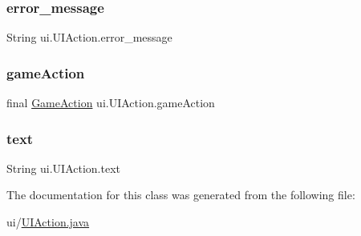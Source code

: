 \subsubsection{\texorpdfstring{error\+\_\+message}{error\_message}}
{\footnotesize\ttfamily String ui.\+U\+I\+Action.\+error\+\_\+message\hspace{0.3cm}{\ttfamily [private]}}

\mbox{\label{classui_1_1_u_i_action_a470f710a9e5ba460ca6926158974e5df}} 
\subsubsection{\texorpdfstring{game\+Action}{gameAction}}
{\footnotesize\ttfamily final \mbox{\hyperlink{classrule_engine_1_1_game_action}{Game\+Action}} ui.\+U\+I\+Action.\+game\+Action\hspace{0.3cm}{\ttfamily [private]}}

\mbox{\label{classui_1_1_u_i_action_ac388713a53d076e056461616ec56f0eb}} 
\subsubsection{\texorpdfstring{text}{text}}
{\footnotesize\ttfamily String ui.\+U\+I\+Action.\+text\hspace{0.3cm}{\ttfamily [private]}}



The documentation for this class was generated from the following file\+:\begin{DoxyCompactItemize}
\item 
ui/\mbox{\hyperlink{_u_i_action_8java}{U\+I\+Action.\+java}}\end{DoxyCompactItemize}
